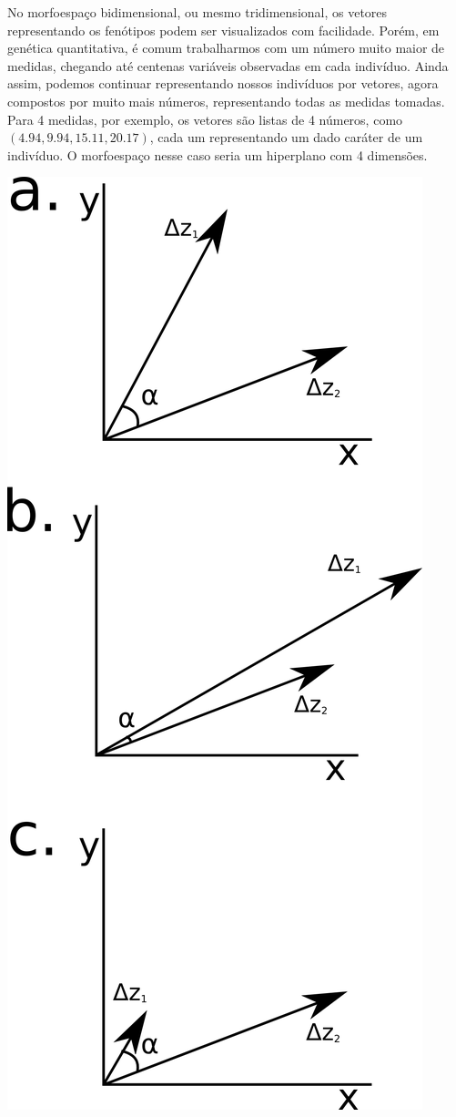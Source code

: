\documentclass[portuges,]{tufte-handout}
\begin{document}
No morfoespaço bidimensional, ou mesmo tridimensional, os vetores
representando os fenótipos podem ser visualizados com facilidade. Porém,
em genética quantitativa, é comum trabalharmos com um número muito maior
de medidas, chegando até centenas variáveis observadas em cada
indivíduo. Ainda assim, podemos continuar representando nossos
indivíduos por vetores, agora compostos por muito mais números,
representando todas as medidas tomadas. Para 4 medidas, por exemplo, os
vetores são listas de 4 números, como $(4.94, 9.94, 15.11, 20.17)$, cada
um representando um dado caráter de um indivíduo. O morfoespaço nesse
caso seria um hiperplano com 4 dimensões.

\begin{marginfigure}
\includegraphics{./figuras/deltazes.png}

\end{marginfigure}
\end{document}
